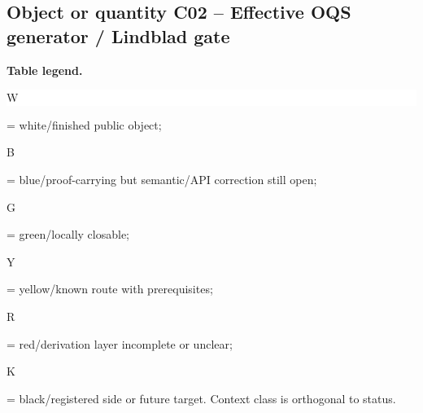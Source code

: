 \subsection*{Object or quantity C02 -- Effective OQS generator /\allowbreak{} Lindblad gate}
\hypertarget{objproof:C02}{}
\par\smallskip\noindent\begin{minipage}{0.99\linewidth}\footnotesize\raggedright\textbf{Table legend.} \colorbox{white}{\strut W} = white/finished public object; \colorbox{cyan!20}{\strut B} = blue/proof-carrying but semantic/API correction still open; \colorbox{green!18}{\strut G} = green/locally closable; \colorbox{yellow!25}{\strut Y} = yellow/known route with prerequisites; \colorbox{red!20}{\strut R} = red/derivation layer incomplete or unclear; \colorbox{black!18}{\strut K} = black/registered side or future target. Context class is orthogonal to status.\end{minipage}\par\vspace{0.25em}
